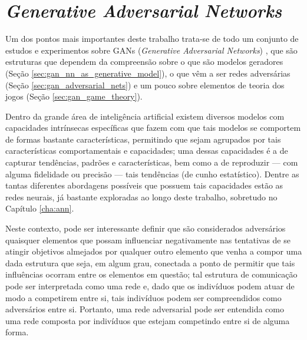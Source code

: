 \chapter{\textit{Generative Adversarial Networks}}
\label{cha:gan}

Um dos pontos mais importantes deste trabalho trata-se de todo um conjunto de estudos e experimentos sobre GANs (\textit{Generative Adversarial Networks}) \citep{NIPS2014_5423}, que são estruturas que dependem da compreensão sobre o que são modelos geradores (Seção \ref{sec:gan_nn_as_generative_model}), o que vêm a ser redes adversárias (Seção \ref{sec:gan_adversarial_nets}) e um pouco sobre elementos de teoria dos jogos (Seção \ref{sec:gan_game_theory}).


Dentro da grande área de inteligência artificial existem diversos modelos com capacidades intrínsecas específicas que fazem com que tais modelos se comportem de formas bastante características, permitindo que sejam agrupados por tais características comportamentais e capacidades; uma dessas capacidades é a de capturar tendências, padrões e características, bem como a de reproduzir --- com alguma fidelidade ou precisão --- tais tendências (de cunho estatístico). Dentre as tantas diferentes abordagens possíveis que possuem tais capacidades estão as redes neurais, já bastante exploradas ao longo deste trabalho, sobretudo no Capítulo \ref{cha:ann}.




Neste contexto, pode ser interessante definir que são considerados adversários quaisquer elementos que possam influenciar negativamente nas tentativas de se atingir objetivos almejados por qualquer outro elemento que venha a compor uma dada estrutura que seja, em algum grau, conectada a ponto de permitir que tais influências ocorram entre os elementos em questão; tal estrutura de comunicação pode ser interpretada como uma rede e, dado que os indivíduos podem atuar de modo a competirem entre si, tais indivíduos podem ser compreendidos como adversários entre si. Portanto, uma rede adversarial pode ser entendida como uma rede composta por indivíduos que estejam competindo entre si de alguma forma.



